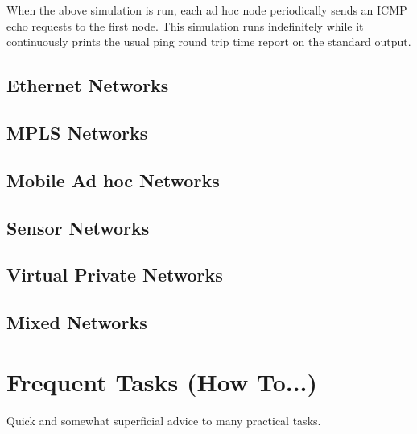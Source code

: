 
When the above simulation is run, each ad hoc node periodically sends an
ICMP echo requests to the first node. This simulation runs indefinitely
while it continuously prints the usual ping round trip time report on the
standard output.

\subsection{Ethernet Networks}


\subsection{MPLS Networks}


\subsection{Mobile Ad hoc Networks}


\subsection{Sensor Networks}


\subsection{Virtual Private Networks}


\subsection{Mixed Networks}



\section{Frequent Tasks (How To...)}

Quick and somewhat superficial advice to many practical tasks.

